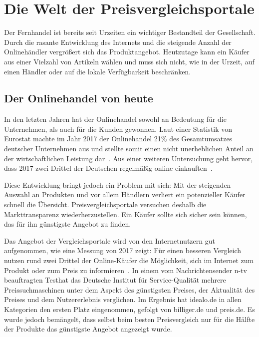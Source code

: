 \section{Die Welt der Preisvergleichsportale}
\label{sec:einleitung}

Der Fernhandel ist bereits seit Urzeiten ein wichtiger Bestandteil der Gesellschaft.
Durch die rasante Entwicklung des Internets und die steigende Anzahl der Onlinehändler vergrößert sich das
Produktangebot.
Heutzutage kann ein Käufer aus einer Vielzahl von Artikeln wählen und muss sich nicht, wie in der Urzeit, auf
einen Händler oder auf die lokale Verfügbarkeit beschränken.

\subsection{Der Onlinehandel von heute}
\label{subsec:onlinehandel-heute}

In den letzten Jahren hat der Onlinehandel sowohl an Bedeutung für die Unternehmen, als auch für die Kunden gewonnen.
Laut einer Statistik von Eurostat machte im Jahr 2017 der Onlinehandel 21\% des Gesamtumsatzes deutscher Unternehmen
aus und stellte somit einen nicht unerheblichen Anteil an der wirtschaftlichen Leistung
dar~\cite{statista:anteil-gesamtumsatz-europa}.
Aus einer weiteren Untersuchung geht hervor, dass 2017 zwei Drittel der Deutschen regelmäßig online
einkauften~\cite{statista:anteil-online-kaeufer-europa}.

Diese Entwicklung bringt jedoch ein Problem mit sich: Mit der steigenden Auswahl an Produkten und vor allem Händlern
verliert ein potenzieller Käufer schnell die Übersicht.
Preisvergleichsportale versuchen deshalb die Markttransparenz wiederherzustellen.
Ein Käufer sollte sich sicher sein können, das für ihn günstigste Angebot zu finden.

Das Angebot der Vergleichsportale wird von den Internetnutzern gut aufgenommen, wie eine Messung von 2017 zeigt:
Für einen besseren Vergleich nutzen rund zwei Drittel der Online-Käufer die Möglichkeit, sich im Internet zum Produkt
oder zum Preis zu informieren~\cite{statista:internetnutzer-preisvergleich-deutschland,
statista:anteil-online-kaeufe-deutschland}.
In einem vom Nachrichtensender n-tv beauftragten Test\footnotemark hat das Deutsche Institut für Service-Qualität
mehrere Preissuchmaschinen unter dem Aspekt des günstigsten Preises, der Aktualität des Preises und dem
Nutzererlebnis verglichen.
Im Ergebnis hat idealo.de in allen Kategorien den ersten Platz eingenommen, gefolgt von billiger.de und preis.de.
Es wurde jedoch bemängelt, dass selbst beim besten Preisvergleich nur für die Hälfte der Produkte das günstigste
Angebot angezeigt wurde.

